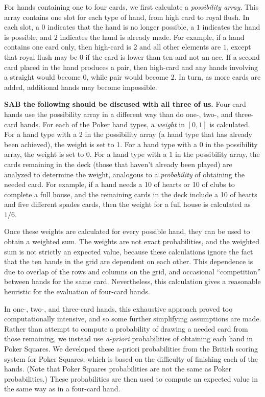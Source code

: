 \documentclass[letterpaper]{article}
\begin{document}
For hands containing one to four cards, we first calculate a {\it possibility array}. This array contains one slot for each type of hand, from high card to royal flush. In each slot, a $0$ indicates that the hand is no longer possible, a $1$ indicates the hand is possible, and $2$ indicates the hand is already made. For example, if a hand contains one card only, then high-card is $2$ and all other elements are $1$, except that royal flush may be $0$ if the card is lower than ten and not an ace. If a second card placed in the hand produces a pair, then high-card and any hands involving a straight would become $0$, while pair would become $2$. In turn, as more cards are added, additional hands may become impossible.

{\bf SAB the following should be discused with all three of us.}
Four-card hands use the possibility array in a different way than do one-, two-, and three-card hands. For each of the Poker hand types, a {\it weight} in $[0,1]$ is calculated. For a hand type with a 2 in the possibility array (a hand type that has already been achieved), the weight is set to 1. For a hand type with a 0 in the possibility array, the weight is set to 0. For a hand type with a 1 in the possibility array, the cards remaining in the deck (those that haven't already been played) are analyzed to determine the weight, analogous to a {\it probability} of obtaining the needed card. For example, if a hand needs a 10 of hearts or 10 of clubs to complete a full house, and the remaining cards in the deck include a 10 of hearts and five different spades cards, then the weight for a full house is calculated as $1 / 6$. 

Once these weights are calculated for every possible hand, they can be used to obtain a weighted sum. The weights are not exact probabilities, and the weighted sum is not strictly an expected value, because these calculations ignore the fact that the ten hands in the grid are dependent on each other. This dependence is due to overlap of the rows and columns on the grid, and occasional ``competition'' between hands for the same card. Nevertheless, this calculation gives a reasonable heuristic for the evaluation of four-card hands.

In one-, two-, and three-card hands, this exhaustive approach proved too computationally intensive, and so some further simplifying assumptions are made. Rather than attempt to compute a probability of drawing a needed card from those remaining, we instead use {\it a-priori} probabilities of obtaining each hand in Poker Squares. We developed these a-priori probabilities from the British scoring system for Poker Squares, which is based on the difficulty of finishing each of the hands. (Note that Poker Squares probabilities are not the same as Poker probabilities.) These probabilities are then used to compute an expected value in the same way as in a four-card hand.
\end{document}

